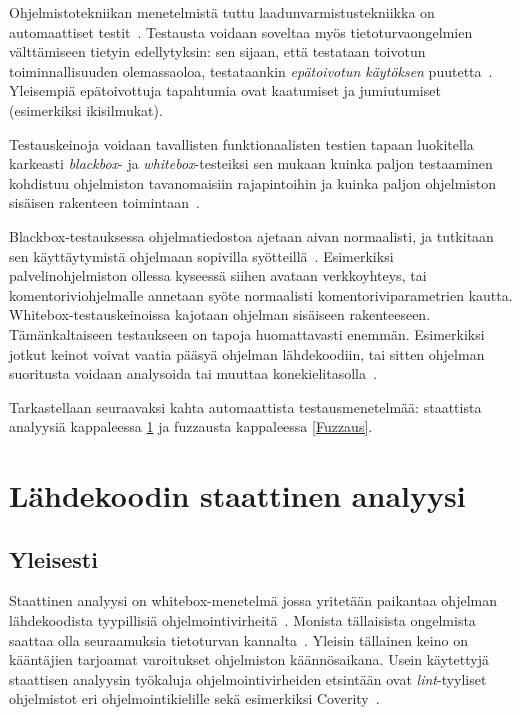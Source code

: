 Ohjelmistotekniikan menetelmistä tuttu laadunvarmistustekniikka on automaattiset testit~\cite[23.1]{Sommerville}.
Testausta voidaan soveltaa myös tietoturvaongelmien välttämiseen tietyin edellytyksin:
sen sijaan, että testataan toivotun toiminnallisuuden olemassaoloa,
testataankin \emph{epätoivotun käytöksen} puutetta~\cite{OuluBrowser}.
Yleisempiä epätoivottuja tapahtumia ovat kaatumiset ja jumiutumiset (esimerkiksi ikisilmukat).


Testauskeinoja voidaan tavallisten funktionaalisten testien tapaan luokitella karkeasti
\emph{blackbox}- ja \emph{whitebox}-testeiksi sen mukaan kuinka paljon
testaaminen kohdistuu ohjelmiston tavanomaisiin rajapintoihin ja kuinka paljon
ohjelmiston sisäisen rakenteen toimintaan~\cite{OuluBrowser}.

Blackbox-testauksessa ohjelmatiedostoa ajetaan aivan normaalisti,
ja tutkitaan sen käyttäytymistä ohjelmaan sopivilla syötteillä~\cite{OuluBrowser}.
Esimerkiksi palvelinohjelmiston ollessa kyseessä siihen avataan verkkoyhteys,
tai komentoriviohjelmalle annetaan syöte normaalisti komentoriviparametrien kautta.
Whitebox-testauskeinoissa kajotaan ohjelman sisäiseen rakenteeseen.
Tä\-män\-kal\-tai\-seen testaukseen on tapoja huomattavasti enemmän.
Esimerkiksi jotkut keinot voivat vaatia pääsyä ohjelman lähdekoodiin,
tai sitten ohjelman suoritusta voidaan analysoida tai muuttaa konekielitasolla~\cite{OuluBrowser}.

Tarkastellaan seuraavaksi kahta automaattista testausmenetelmää: staattista analyysiä
kappaleessa \ref{StaattinenAnalyysi} ja fuzzausta kappaleessa \ref{Fuzzaus}.
\fixme[vanhentunut]

\section{Lähdekoodin staattinen analyysi}
\label{StaattinenAnalyysi}

\subsection{Yleisesti}

Staattinen analyysi on whitebox-menetelmä jossa yritetään paikantaa ohjelman
lähdekoodista tyypillisiä ohjelmointivirheitä~\cite[22.3]{Sommerville}.
Monista täl\-lai\-sis\-ta ongelmista saattaa olla seuraamuksia tietoturvan kannalta~\cite{StaticCodeAnalysis}.
Yleisin tällainen keino on kääntäjien tarjoamat varoitukset ohjelmiston käännösaikana.
Usein käytettyjä staattisen analyysin työkaluja ohjelmointivirheiden etsintään
ovat \emph{lint}-tyyliset~\cite{Lint} ohjelmistot eri ohjelmointikielille sekä
esimerkiksi Coverity~\cite{Coverity}.

